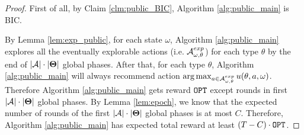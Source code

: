 \begin{proof}
First of all, by Claim \ref{clm:public_BIC}, Algorithm \ref{alg:public_main} is BIC.

By Lemma \ref{lem:exp_public}, for each state $\omega$, Algorithm \ref{alg:public_main} explores all the eventually explorable actions (i.e. $\mathcal{A}_{\omega,\theta}^{exp}$) for each type $\theta$ by the end of $|\mathcal{A}|\cdot |\bold{\Theta}|$ global phases. After that, for each type $\theta$, Algorithm \ref{alg:public_main} will always recommend action $ \arg\max_{a \in \mathcal{A}_{\omega,\theta}^{exp}} u(\theta, a, \omega)$. Therefore Algorithm \ref{alg:public_main} gets reward $\mathtt{OPT}$ except rounds in first $|\mathcal{A}|\cdot |\bold{\Theta}|$ global phases. By Lemma \ref{lem:epoch}, we know that the expected number of rounds of the first  $|\mathcal{A}|\cdot |\bold{\Theta}|$ global phases is at most $C$. Therefore, Algorithm \ref{alg:public_main} has expected total reward at least  $\left(T - C \right) \cdot \mathtt{OPT}$.

\end{proof} 